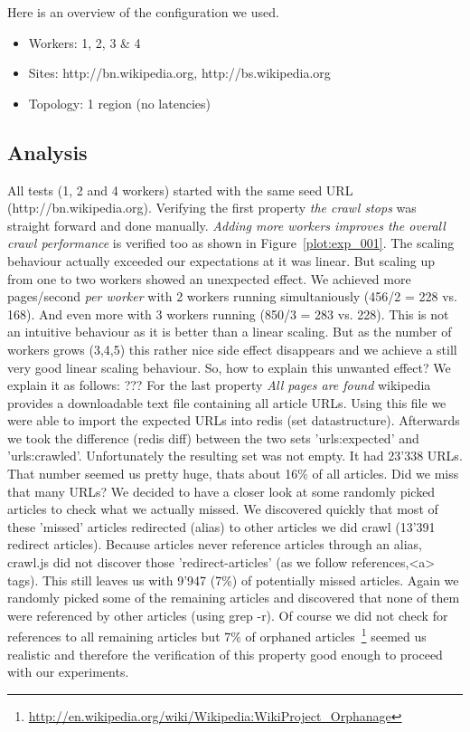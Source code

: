 Here is an overview of the configuration we used.

\begin{itemize}
  \item Workers: 1, 2, 3 \& 4
  \item Sites: http://bn.wikipedia.org, http://bs.wikipedia.org
  \item Topology: 1 region (no latencies)
\end{itemize}

\subsection{Analysis}

All tests (1, 2 and 4 workers) started with the same seed URL (http://bn.wikipedia.org). Verifying the first property \emph{the crawl stops} was straight forward and done manually. \emph{Adding more workers improves the overall crawl performance} is verified too as shown in Figure~\ref{plot:exp_001}. The scaling behaviour actually exceeded our expectations at it was linear. But scaling up from one to two workers showed an unexpected effect. We achieved more pages/second \emph{per worker} with 2 workers running simultaniously (456/2 = 228 vs. 168). And even more with 3 workers running (850/3 = 283 vs. 228). This is not an intuitive behaviour as it is better than a linear scaling. But as the number of workers grows (3,4,5) this rather nice side effect disappears and we achieve a still very good linear scaling behaviour.
\newline
\newline
So, how to explain this unwanted effect? We explain it as follows: ???
\newline
\newline
For the last property \emph{All pages are found} wikipedia provides a downloadable text file containing all article URLs. Using this file we were able to import the expected URLs into redis (set datastructure). Afterwards we took the difference (redis diff) between the two sets 'urls:expected' and 'urls:crawled'. Unfortunately the resulting set was not empty. It had 23'338 URLs. That number seemed us pretty huge, thats about 16\% of all articles. Did we miss that many URLs? We decided to have a closer look at some randomly picked articles to check what we actually missed. We discovered quickly that most of these 'missed' articles redirected (alias) to other articles we did crawl (13'391 redirect articles). Because articles never reference articles through an alias, crawl.js did not discover those 'redirect-articles' (as we follow references,<a> tags). This still leaves us with 9'947 (7\%) of potentially missed articles. Again we randomly picked some of the remaining articles and discovered that none of them were referenced by other articles (using grep -r). Of course we did not check for references to all remaining articles but 7\% of orphaned articles~\footnote{\url{http://en.wikipedia.org/wiki/Wikipedia:WikiProject_Orphanage}} seemed us realistic and therefore the verification of this property good enough to proceed with our experiments.

